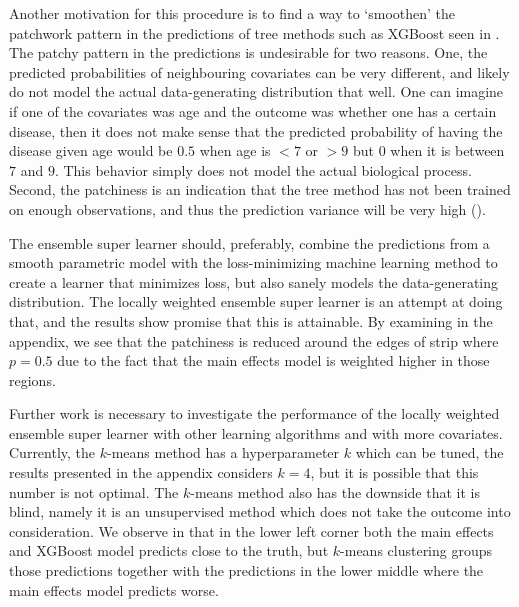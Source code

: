 \documentclass[11pt, a4paper]{article}
\theoremstyle{definition}
\theoremstyle{remark}
\begin{document}
Another motivation for this procedure is to find a way to `smoothen' the patchwork pattern in the predictions of tree methods such as XGBoost seen in . The patchy pattern in the predictions is undesirable for two reasons. One, the predicted probabilities of neighbouring covariates can be very different, and likely do not model the actual data-generating distribution that well. One can imagine if one of the covariates was age and the outcome was whether one has a certain disease, then it does not make sense that the predicted probability of having the disease given age would be $ 0.5 $ when age is $ <7 $ or $ >9 $ but $ 0 $ when it is between $ 7 $ and $ 9 $. This behavior simply does not model the actual biological process. Second, the patchiness is an indication that the tree method has not been trained on enough observations, and thus the prediction variance will be very high (). 

The ensemble super learner should, preferably, combine the predictions from a smooth parametric model with the loss-minimizing machine learning method to create a learner that minimizes loss, but also sanely models the data-generating distribution. The locally weighted ensemble super learner is an attempt at doing that, and the results show promise that this is attainable. By examining  in the appendix, we see that the patchiness is reduced around the edges of strip where $ p = 0.5 $ due to the fact that the main effects model is weighted higher in those regions.

Further work is necessary to investigate the performance of the locally weighted ensemble super learner with other learning algorithms and with more covariates. Currently, the $ k $-means method has a hyperparameter $ k $ which can be tuned, the results presented in the appendix considers $ k = 4 $, but it is possible that this number is not optimal. The $ k $-means method also has the downside that it is blind, namely it is an unsupervised method which does not take the outcome into consideration. We observe in  that in the lower left corner both the main effects and XGBoost model predicts close to the truth, but $ k $-means clustering groups those predictions together with the predictions in the lower middle where the main effects model predicts worse. 
\end{document}
